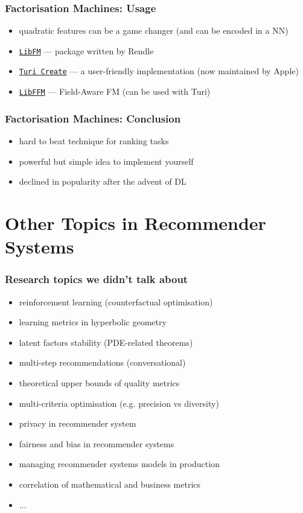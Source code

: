 \documentclass[t]{beamer}
\begin{document}
\begin{frame}
  \frametitle{Factorisation Machines: Usage}
  \begin{itemize}
  \item quadratic features can be a game changer (and can be encoded in a NN)
  \item \href{http://libfm.org/}{\texttt{LibFM}} --- package written by Rendle
  \item \href{https://github.com/apple/turicreate}{\texttt{Turi Create}} --- a user-friendly implementation (now maintained by Apple)
  \item \href{https://github.com/ycjuan/libffm}{\texttt{LibFFM}} --- Field-Aware FM (can be used with Turi)
  \end{itemize}
\end{frame}
\begin{frame}
  \frametitle{Factorisation Machines: Conclusion}
  \begin{itemize}
  \item hard to beat technique for ranking tasks
  \item powerful but simple idea to implement yourself
  \item declined in popularity after the advent of DL
  \end{itemize}
\end{frame}
\section{Other Topics in Recommender Systems}
\begin{frame}
  \frametitle{Research topics we didn't talk about}
  \begin{itemize}
  \item reinforcement learning (counterfactual optimisation)
  \item learning metrics in hyperbolic geometry
  \item latent factors stability (PDE-related theorems)
  \item multi-step recommendations (conversational)
  \item theoretical upper bounds of quality metrics
  \item multi-criteria optimisation (e.g. precision vs diversity)
  \item privacy in recommender system
  \item fairness and bias in recommender systems
  \item managing recommender systems models in production
  \item correlation of mathematical and business metrics
  \item $\dots$
  \end{itemize}
\end{frame}
\end{document}
